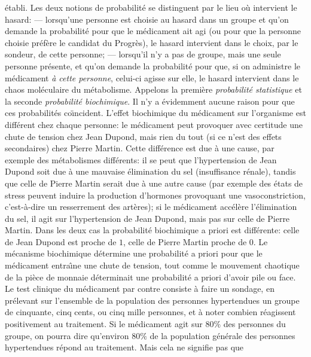 \'etabli. 
\medskip 
Les deux notions de probabilit\'e se distinguent par le lieu o\`u
intervient le hasard: 
\smallskip 
--- lorsqu'une personne est choisie au hasard dans un groupe et 
qu'on demande la probabilit\'e pour que le m\'edicament ait agi (ou pour
que la personne choisie pr\'ef\`ere le candidat du Progr\`es), le hasard 
intervient dans le choix, par le sondeur, de cette personne; 
\smallskip 
--- lorsqu'il n'y a pas de groupe, mais une seule personne pr\'esente, 
et qu'on demande la probabilit\'e pour que, si on administre le
m\'edicament {\it \`a cette personne}, celui-ci agisse sur elle, le 
hasard intervient dans le chaos mol\'eculaire du m\'etabolisme. 
\medskip 
Appelons la premi\`ere {\it probabilit\'e statistique} et la seconde
{\it probabilit\'e biochimique}.  Il n'y a \'evidemment aucune raison pour 
que ces probabilit\'es co{\"\i}ncident. 
\medskip
L'effet biochimique du m\'edicament sur l'organisme est diff\'erent
chez chaque personne: le m\'edicament peut provoquer avec certitude
une chute de tension chez Jean Dupond, mais rien du tout (si ce n'est
des effets secondaires) chez Pierre Martin. Cette diff\'erence est due 
\`a une cause, par exemple des m\'etabolismes diff\'erents: il se peut
que l'hypertension de Jean Dupond soit due \`a une mauvaise 
\'elimination du sel (insuffisance r\'enale), tandis que celle de 
Pierre Martin serait due \`a une 
autre cause (par exemple des \'etats de stress peuvent induire la 
production d'hormones provoquant une vasoconstriction, c'est-\`a-dire 
un resserrement des art\`eres); si le m\'edicament acc\'el\`ere 
l'\'elimination du sel, il agit sur l'hypertension de Jean Dupond, mais pas 
sur celle de Pierre Martin. Dans les deux cas la probabilit\'e biochimique 
a priori est diff\'erente: celle de Jean Dupond est proche de $1$, celle
de Pierre Martin proche de $0$. Le m\'ecanisme biochimique
d\'etermine une probabilit\'e a priori pour que le m\'edicament 
entra{\^\i}ne une chute de tension, tout comme le mouvement chaotique 
de la pi\`ece de monnaie d\'eterminait une probabilit\'e a priori d'avoir 
pile ou face. 
\medskip 
Le test clinique du m\'edicament par contre consiste \`a faire un
sondage, en pr\'elevant sur l'ensemble de la population des personnes 
hypertendues un groupe de cinquante, cinq cents, ou cinq mille 
personnes, et \`a noter combien r\'eagissent positivement au traitement. 
Si le m\'edicament agit sur $80\%$ des personnes du groupe, on pourra 
dire qu'environ $80\%$ de la po\-pu\-la\-tion g\'en\'erale des personnes 
hypertendues r\'epond au traitement. Mais cela ne signifie pas que 
